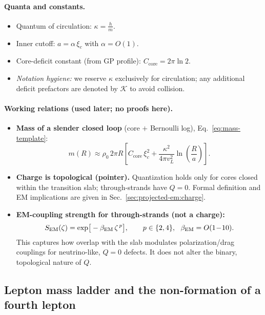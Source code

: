 \paragraph{Quanta and constants.}
\begin{itemize}
  \item Quantum of circulation: $\kappa=\frac{h}{m}$.
  \item Inner cutoff: $a=\alpha\,\xi_c$ with $\alpha=O(1)$.
  \item Core-deficit constant (from GP profile): $C_{\mathrm{core}}=2\pi\ln 2$.
  \item \emph{Notation hygiene:} we reserve $\kappa$ exclusively for circulation; any additional deficit prefactors are denoted by $\mathcal{K}$ to avoid collision.
\end{itemize}

\paragraph{Working relations (used later; no proofs here).}
\begin{itemize}
  \item \textbf{Mass of a slender closed loop} (core $+$ Bernoulli log), Eq.~\eqref{eq:mass-template}:
  \[
  m(R)\approx \rho_0\,2\pi R\left[
  C_{\mathrm{core}}\,\xi_c^2+\frac{\kappa^2}{4\pi v_L^2}\ln\!\left(\frac{R}{a}\right)\right].
  \]
  \item \textbf{Charge is topological (pointer).} Quantization holds only for cores closed within the transition slab; through-strands have $Q=0$. Formal definition and EM implications are given in Sec.~\ref{sec:projected-em:charge}.
  \item \textbf{EM-coupling strength for through-strands (not a charge):}
  \[
  S_{\rm EM}(\zeta)=\exp\!\big[-\beta_{\rm EM}\,\zeta^{\,p}\big],\qquad
  p\in\{2,4\},\ \ \beta_{\rm EM}=O(1\!-\!10).
  \]
  This captures how overlap with the slab modulates polarization/drag couplings for neutrino-like, $Q=0$ defects. It does not alter the binary, topological nature of $Q$.
\end{itemize}

\subsection{Lepton mass ladder and the non-formation of a fourth lepton}\label{sec:leptons}

